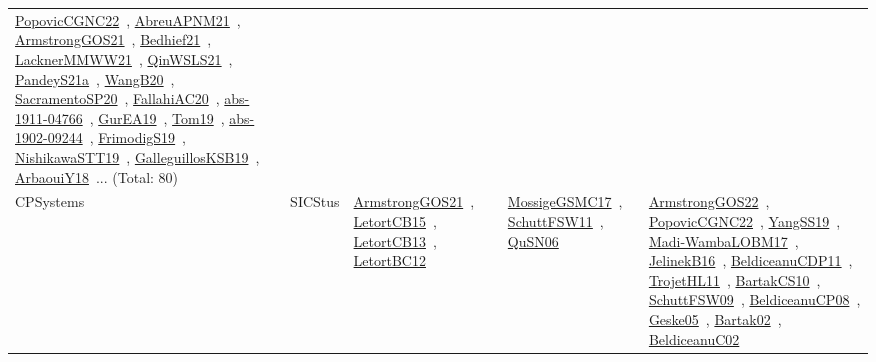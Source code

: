 {\begin{longtable}{lp{3cm}>{\raggedright\arraybackslash}p{6cm}>{\raggedright\arraybackslash}p{6cm}>{\raggedright\arraybackslash}p{8cm}}
\href{works/PopovicCGNC22.pdf}{PopovicCGNC22}~\cite{PopovicCGNC22}, \href{works/AbreuAPNM21.pdf}{AbreuAPNM21}~\cite{AbreuAPNM21}, \href{works/ArmstrongGOS21.pdf}{ArmstrongGOS21}~\cite{ArmstrongGOS21}, \href{works/Bedhief21.pdf}{Bedhief21}~\cite{Bedhief21}, \href{works/LacknerMMWW21.pdf}{LacknerMMWW21}~\cite{LacknerMMWW21}, \href{works/QinWSLS21.pdf}{QinWSLS21}~\cite{QinWSLS21}, \href{works/PandeyS21a.pdf}{PandeyS21a}~\cite{PandeyS21a}, \href{works/WangB20.pdf}{WangB20}~\cite{WangB20}, \href{works/SacramentoSP20.pdf}{SacramentoSP20}~\cite{SacramentoSP20}, \href{works/FallahiAC20.pdf}{FallahiAC20}~\cite{FallahiAC20}, \href{works/abs-1911-04766.pdf}{abs-1911-04766}~\cite{abs-1911-04766}, \href{works/GurEA19.pdf}{GurEA19}~\cite{GurEA19}, \href{works/Tom19.pdf}{Tom19}~\cite{Tom19}, \href{works/abs-1902-09244.pdf}{abs-1902-09244}~\cite{abs-1902-09244}, \href{works/FrimodigS19.pdf}{FrimodigS19}~\cite{FrimodigS19}, \href{works/NishikawaSTT19.pdf}{NishikawaSTT19}~\cite{NishikawaSTT19}, \href{works/GalleguillosKSB19.pdf}{GalleguillosKSB19}~\cite{GalleguillosKSB19}, \href{works/ArbaouiY18.pdf}{ArbaouiY18}~\cite{ArbaouiY18}... (Total: 80)\\
CPSystems & SICStus & \href{works/ArmstrongGOS21.pdf}{ArmstrongGOS21}~\cite{ArmstrongGOS21}, \href{works/LetortCB15.pdf}{LetortCB15}~\cite{LetortCB15}, \href{works/LetortCB13.pdf}{LetortCB13}~\cite{LetortCB13}, \href{works/LetortBC12.pdf}{LetortBC12}~\cite{LetortBC12} & \href{works/MossigeGSMC17.pdf}{MossigeGSMC17}~\cite{MossigeGSMC17}, \href{works/SchuttFSW11.pdf}{SchuttFSW11}~\cite{SchuttFSW11}, \href{works/QuSN06.pdf}{QuSN06}~\cite{QuSN06} & \href{works/ArmstrongGOS22.pdf}{ArmstrongGOS22}~\cite{ArmstrongGOS22}, \href{works/PopovicCGNC22.pdf}{PopovicCGNC22}~\cite{PopovicCGNC22}, \href{works/YangSS19.pdf}{YangSS19}~\cite{YangSS19}, \href{works/Madi-WambaLOBM17.pdf}{Madi-WambaLOBM17}~\cite{Madi-WambaLOBM17}, \href{works/JelinekB16.pdf}{JelinekB16}~\cite{JelinekB16}, \href{works/BeldiceanuCDP11.pdf}{BeldiceanuCDP11}~\cite{BeldiceanuCDP11}, \href{works/TrojetHL11.pdf}{TrojetHL11}~\cite{TrojetHL11}, \href{works/BartakCS10.pdf}{BartakCS10}~\cite{BartakCS10}, \href{works/SchuttFSW09.pdf}{SchuttFSW09}~\cite{SchuttFSW09}, \href{works/BeldiceanuCP08.pdf}{BeldiceanuCP08}~\cite{BeldiceanuCP08}, \href{works/Geske05.pdf}{Geske05}~\cite{Geske05}, \href{works/Bartak02.pdf}{Bartak02}~\cite{Bartak02}, \href{works/BeldiceanuC02.pdf}{BeldiceanuC02}~\cite{BeldiceanuC02}\\

\end{longtable}}
